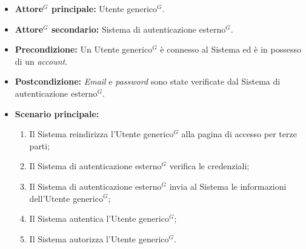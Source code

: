 \label{usecase:Effettua accesso per terze parti}
\begin{itemize}

	\item \textbf{\gls{Attore}$^G$ principale:} \gls{Utente generico}$^G$.
	\item \textbf{\gls{Attore}$^G$ secondario:} Sistema di autenticazione esterno$^G$.

	\item \textbf{Precondizione:} Un \gls{Utente generico}$^G$ è connesso al Sistema ed è in possesso di un \textit{account}.

	\item \textbf{Postcondizione:} \textit{Email} e \textit{password} sono state verificate dal Sistema di autenticazione esterno$^G$.

	\item \textbf{Scenario principale:}
	\begin{enumerate}
		\item Il Sistema reindirizza l'\gls{Utente generico}$^G$ alla pagina di accesso per terze parti;
		\item Il Sistema di autenticazione esterno$^G$ verifica le credenziali;
		\item Il Sistema di autenticazione esterno$^G$ invia al Sistema le informazioni dell'\gls{Utente generico}$^G$;
		\item Il Sistema autentica l'\gls{Utente generico}$^G$;
		\item Il Sistema autorizza l'\gls{Utente generico}$^G$.
	\end{enumerate}
	
\end{itemize}
